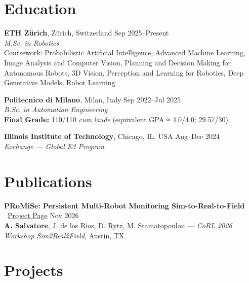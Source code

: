 \documentclass[a4paper,10pt]{article}
\begin{document}
\section*{Education}

\textbf{ETH Zürich}, Zürich, Switzerland \hfill Sep 2025--Present\\
\textit{M.Sc. in Robotics} \\
Coursework: Probabilistic Artificial Intelligence, Advanced Machine Learning, Image Analysis and Computer Vision,  Planning and Decision Making for Autonomous Robots, 3D Vision, Perception and Learning for Robotics, Deep Generative Models, Robot Learning

\textbf{Politecnico di Milano}, Milan, Italy \hfill Sep 2022--Jul 2025\\
\textit{B.Sc. in Automation Engineering} \\
\textbf{Final Grade:} 110/110 \textit{cum laude} (equivalent GPA ≈ 4.0/4.0; 29.57/30).\\
\vspace{-10pt}

\textbf{Illinois Institute of Technology}, Chicago, IL, USA \hfill Aug--Dec 2024\\
\textit{Exchange — Global E3 Program} \\
\vspace{-10pt}
\section*{Publications}
\textbf{PRoMiSe: Persistent Multi-Robot Monitoring Sim-to-Real-to-Field} \faGlobe\ \href{https://paperanonyms.github.io/promise/}{Project Page} \hfill Nov 2026\\
\textbf{A. Salvatore}, J. de los Rios, D. Rytz, M. Stamatopoulou --- \textit{CoRL 2026 Workshop Sim2Real2Field}, Austin, TX
\vspace{4pt}

\section*{Projects}
\end{document}

